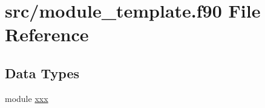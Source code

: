 \hypertarget{module__template_8f90}{\section{src/module\-\_\-template.f90 File Reference}
\label{module__template_8f90}
}
\subsection*{Data Types}
\begin{DoxyCompactItemize}
\item 
module \hyperlink{classxxx}{xxx}
\end{DoxyCompactItemize}
